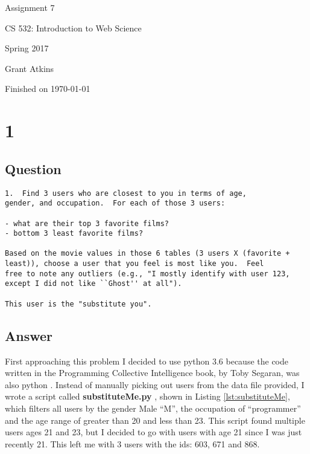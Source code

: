 \documentclass[letterpaper,11pt]{article}
\begin{document}
\begin{titlepage}

\begin{center}

\Huge{Assignment 7}

\Large{CS 532:  Introduction to Web Science}

\Large{Spring 2017}

\Large{Grant Atkins}

\Large Finished on \today

\end{center}

\end{titlepage}

\newpage


\section*{1}

\subsection*{Question}

\begin{verbatim}
1.  Find 3 users who are closest to you in terms of age, 
gender, and occupation.  For each of those 3 users:

- what are their top 3 favorite films?
- bottom 3 least favorite films?

Based on the movie values in those 6 tables (3 users X (favorite +
least)), choose a user that you feel is most like you.  Feel 
free to note any outliers (e.g., "I mostly identify with user 123,
except I did not like ``Ghost'' at all").  

This user is the "substitute you".  
\end{verbatim}

\clearpage
\subsection*{Answer}

First approaching this problem I decided to use python 3.6 because the code written in the Programming Collective Intelligence book, by Toby Segaran, was also python \cite{collectiveIntell}. Instead of manually picking out users from the data file provided, I wrote a script called \textbf{substituteMe.py} , shown in Listing \ref{lst:substituteMe}, which filters all users by the gender Male ``M'', the occupation of ``programmer'' and the age range of greater than 20 and less than 23. This script found multiple users ages 21 and 23, but I decided to go with users with age 21 since I was just recently 21. This left me with 3 users with the ids: 603, 671 and 868. 
\end{document}
